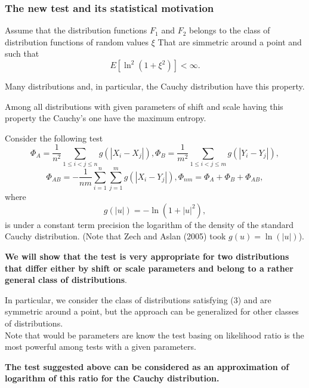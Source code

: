 \documentclass[slidestop,usepdftitle=false]{beamer}
\begin{document}
\begin{slide}
\frametitle{The new test and its statistical motivation}

Assume that the distribution functions
$F_1$ and $F_2$ belongs to the class of distribution functions of random values  $\xi$ That are simmetric around a point and such that
\begin {equation}\label{Class}
E [\ln^2 (1+ \xi^2)     ] < \infty.
\end{equation}



Many distributions and, in particular, the Cauchy distribution have this property.
 \bigskip

Among all distributions with given parameters of shift and scale having this property the Cauchy's one have the maximum entropy.\\

\end{slide}
\begin{slide}
Consider the following test
\begin{equation}
 \Phi_{A}=\frac{1}{n^2}\sum_{1\leq i<j\leq n} g(|X_i-X_j|),
\Phi_{B}=\frac{1}{m^2}\sum_{1\leq i<j\leq m} g(|Y_i-Y_j|),
\end{equation}
\begin{equation}\label{K1}
\Phi_{AB}=-\frac{1}{nm}\sum_{i=1}^n\sum_{j=1}^m g(|X_i-Y_j|),
\Phi_{nm}=\Phi_{A}+ \Phi_{B}+ \Phi_{AB},
\end{equation}
where
$$
g(|u|)= -\ln (1+|u|^2),
$$
is under a constant term precision the logarithm of the density of the standard Cauchy distribution.
(Note that Zech and Aslan (2005) took $g(u)=\ln(|u|)$).

\end{slide}
\begin{slide}

{\bf We will show that the test  is very appropriate for two distributions that differ either by shift or scale parameters and belong to a rather general class of distributions}.
\bigskip

In particular, we consider the class of distributions  satisfying (3) and    are symmetric around a point, but the approach can be generalized for other classes of distributions.\\
\bigskip
  Note that would be parameters are know the test basing on likelihood ratio is the most powerful among tests with a given parameters.

\bigskip
{\bf The test suggested above can be considered as an approximation of logarithm of this ratio for the Cauchy distribution.}

\end{slide}
\end{document}
